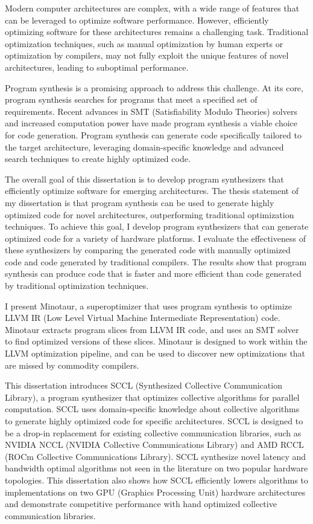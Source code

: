 Modern computer architectures are complex, with a wide range of
features that can be leveraged to optimize software performance.
However, efficiently optimizing software for these architectures
remains a challenging task. Traditional optimization techniques,
such as manual optimization by human experts or optimization by
compilers, may not fully exploit the unique features of novel
architectures, leading to suboptimal performance.

Program synthesis is a promising approach to address this challenge.
At its core, program synthesis searches for programs that meet a
specified set of requirements. Recent advances in SMT (Satisfiability
Modulo Theories) solvers and increased computation power have made
program synthesis a viable choice for code generation. Program
synthesis can generate code specifically tailored to the target
architecture, leveraging domain-specific knowledge and advanced search
techniques to create highly optimized code.

The overall goal of this dissertation is to develop program
synthesizers that efficiently optimize software for emerging
architectures. The thesis statement of my dissertation is that program
synthesis can be used to generate highly optimized code for novel
architectures, outperforming traditional optimization techniques. To
achieve this goal, I develop program synthesizers that can
generate optimized code for a variety of hardware platforms. I
evaluate the effectiveness of these synthesizers by comparing the
generated code with manually optimized code and code generated by
traditional compilers. The results show that program synthesis can
produce code that is faster and more efficient than code generated by
traditional optimization techniques.

I present Minotaur, a superoptimizer that uses program synthesis to
optimize LLVM IR (Low Level Virtual Machine Intermediate
Representation) code. Minotaur extracts program slices from LLVM IR
code, and uses an SMT solver to find optimized versions of these
slices. Minotaur is designed to work within the LLVM optimization
pipeline, and can be used to discover new optimizations that are
missed by commodity compilers.

This dissertation introduces SCCL (Synthesized Collective
Communication Library), a program synthesizer that optimizes
collective algorithms for parallel computation. SCCL uses
domain-specific knowledge about collective algorithms to generate
highly optimized code for specific architectures. SCCL is designed to
be a drop-in replacement for existing collective communication
libraries, such as NVIDIA NCCL (NVIDIA Collective Communications
Library) and AMD RCCL (ROCm Collective Communications Library). SCCL
synthesize novel latency and bandwidth optimal algorithms not seen in
the literature on two popular hardware topologies. This dissertation
also shows how SCCL efficiently lowers algorithms to implementations
on two GPU (Graphics Processing Unit) hardware architectures and
demonstrate competitive performance with hand optimized collective
communication libraries.